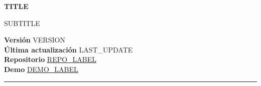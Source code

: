 \documentclass[10pt]{article}
\begin{document}
\sloppy

\noindent
\begin{minipage}{0.7\textwidth}
  \raggedright
  {\color{accent}\fontsize{42}{50}\selectfont\bfseries {{TITLE}}\par}
  \vspace{6pt}
  {\color{mutedtext}\Large {{SUBTITLE}}}
\end{minipage}
\hfill
\begin{minipage}{0.28\textwidth}
  \raggedleft\small\color{mutedtext}
  \textbf{Versión} {{VERSION}} \\
  \textbf{Última actualización} {{LAST_UPDATE}} \\
  \textbf{Repositorio} \href{{{REPO_URL}}}{{{REPO_LABEL}}} \\
  \textbf{Demo} \href{{{DEMO_URL}}}{{{DEMO_LABEL}}}
\end{minipage}

\vspace{6pt}
\noindent\textcolor{accent}{\rule{\linewidth}{2pt}}
\vspace{14pt}
\end{document}
